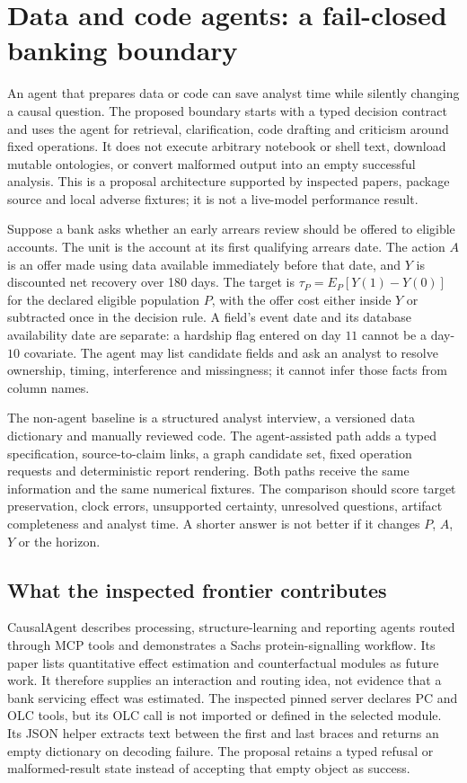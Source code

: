 \section{Data and code agents: a fail-closed banking boundary}
\label{exec13:data-code-agents}

An agent that prepares data or code can save analyst time while silently changing a causal question. The proposed boundary starts with a typed decision contract and uses the agent for retrieval, clarification, code drafting and criticism around fixed operations. It does not execute arbitrary notebook or shell text, download mutable ontologies, or convert malformed output into an empty successful analysis. This is a proposal architecture supported by inspected papers, package source and local adverse fixtures; it is not a live-model performance result.

Suppose a bank asks whether an early arrears review should be offered to eligible accounts. The unit is the account at its first qualifying arrears date. The action $A$ is an offer made using data available immediately before that date, and $Y$ is discounted net recovery over 180 days. The target is $\tau_P=E_P[Y(1)-Y(0)]$ for the declared eligible population $P$, with the offer cost either inside $Y$ or subtracted once in the decision rule. A field's event date and its database availability date are separate: a hardship flag entered on day $11$ cannot be a day-$10$ covariate. The agent may list candidate fields and ask an analyst to resolve ownership, timing, interference and missingness; it cannot infer those facts from column names.

The non-agent baseline is a structured analyst interview, a versioned data dictionary and manually reviewed code. The agent-assisted path adds a typed specification, source-to-claim links, a graph candidate set, fixed operation requests and deterministic report rendering. Both paths receive the same information and the same numerical fixtures. The comparison should score target preservation, clock errors, unsupported certainty, unresolved questions, artifact completeness and analyst time. A shorter answer is not better if it changes $P$, $A$, $Y$ or the horizon.

\subsection{What the inspected frontier contributes}

CausalAgent describes processing, structure-learning and reporting agents routed through MCP tools and demonstrates a Sachs protein-signalling workflow. Its paper lists quantitative effect estimation and counterfactual modules as future work. It therefore supplies an interaction and routing idea, not evidence that a bank servicing effect was estimated. The inspected pinned server declares PC and OLC tools, but its OLC call is not imported or defined in the selected module. Its JSON helper extracts text between the first and last braces and returns an empty dictionary on decoding failure. The proposal retains a typed refusal or malformed-result state instead of accepting that empty object as success.\cite{exec13_data_causalagent,exec13_data_causalagent_code}

